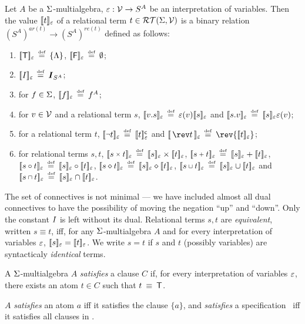 \begin{definition} \label {def:rel-semantics}
Let $A$ be a \(\Sigma\)-multialgebra, \(\varepsilon: {\cal V} \to S^A\) be an
interpretation of variables.  Then the value \([\![t]\!]_{\varepsilon}\) of a relational term
$t\in{\cal RT}(\Sigma,{\cal V})$ is a binary relation 
\((S^A)^{ar(t)}\to (S^A)^{re(t)}\) defined as follows:
\begin{enumerate}\smallerspaces
\item \([\![{\sf T}]\!]_{\varepsilon} \,\mathrel {\stackrel {\mbox {\tiny def}}{=}\:} \{\Lambda\}\), \([\![{\sf F}]\!]_{\varepsilon} \,\mathrel {\stackrel {\mbox {\tiny def}}{=}\:}
  \emptyset\);
\item \([\![I]\!]_{\varepsilon}\,\mathrel {\stackrel {\mbox {\tiny def}}{=}\:} \mbox{\boldmath$I$}_{S^A}\);
\item for $f\in \Sigma$, \([\![f]\!]_{\varepsilon}\,\mathrel {\stackrel {\mbox {\tiny def}}{=}\:} f^A\);
\item for \(v\in{\cal V}\) and a relational term $s$, \([\![v.s]\!]_{\varepsilon}\,\mathrel {\stackrel {\mbox {\tiny def}}{=}\:}
  \varepsilon(v)[\![s]\!]_{\varepsilon}\) and \([\![s.v]\!]_{\varepsilon}\,\mathrel {\stackrel {\mbox {\tiny def}}{=}\:} [\![s]\!]_{\varepsilon}\varepsilon (v)\);
\item for a relational term $t$, \(\Value {\Neg
  t}\Def \Com{\Value t}\) and \(\Value {\,\rev
  t\,}\Def \rev{\Value t}\);
\item for relational terms \(s,t\), \(\Value {s\pro t} \Def \Value s\times
  \Value t\), \(\Value {s\plu t} \Def \Value s + \Value t\), \([\![s\circ t]\!]_{\varepsilon} \,\mathrel {\stackrel {\mbox {\tiny def}}{=}\:} [\![s]\!]_{\varepsilon}\circ [\![t]\!]_{\varepsilon}\), \([\![s\diamond t]\!]_{\varepsilon} \,\mathrel {\stackrel {\mbox {\tiny def}}{=}\:}
  [\![s]\!]_{\varepsilon} \diamond [\![t]\!]_{\varepsilon}\), \(\Value {s\join t} \Def
  \Value s \cup \Value t\) and \(\Value {s\meet t} \Def
  \Value s \cap \Value t\).
\vspace{-1ex}
\end{enumerate}
\end{definition}

The set of connectives is not minimal --- we have included almost all dual
connectives to have the possibility of moving the negation ``up'' and
``down''.  Only the constant \(I\) is left without its dual.  Relational
terms $s,t$ are {\em equivalent}, written \(s\equiv t\), iff, for any
\(\Sigma\)-multialgebra $A$ and for every interpretation of variables
$\varepsilon$, \([\![s]\!]_{\varepsilon}=[\![t]\!]_{\varepsilon}\).  We write \(s=t\) if $s$ and $t$ (possibly
variables) are syntacticaly {\em identical} terms.


\begin{definition}\label {def:rel-satisfies}
A \(\Sigma\)-multialgebra $A$ {\em satisfies} a clause $C$ if, for every
interpretation of variables $\varepsilon$, there exists an atom $t\in C$ such that
\(t \equiv \true \).

$A$ {\em satisfies} an atom $a$ iff it satisfies the clause
\(\{ a\}\), and {\em satisfies} a specification \Spec\ iff it satisfies all
clauses in \Spec.
\end{definition}

